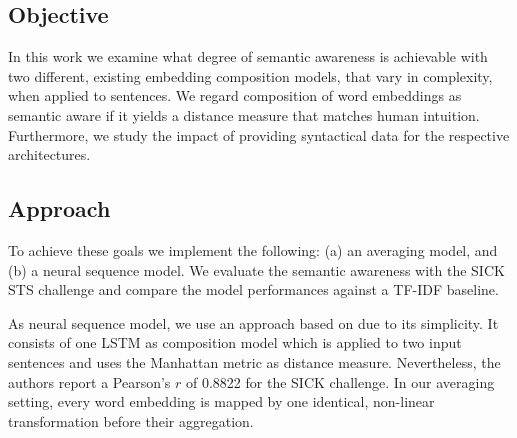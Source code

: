 
\subsection{Objective}
In this work we examine what degree of semantic awareness is achievable with two different, existing embedding composition models, that vary in complexity, when applied to sentences.%
We regard composition of word embeddings as semantic aware if it yields a distance measure that matches human intuition. Furthermore, we study the impact of providing syntactical data for the respective architectures.

\subsection{Approach}
To achieve these goals we implement the following: (a) an averaging model, and (b) a neural sequence model. We evaluate the semantic awareness with the SICK \ac{STS} challenge \autocite{marelli_sick_2014} and compare the model performances against a \acs{TF-IDF} baseline.



As neural sequence model, we use an approach based on \Textcite{mueller_siamese_2016} due to its simplicity. It consists of one LSTM as composition model which is applied to two input sentences and uses the Manhattan metric as distance measure. Nevertheless, the authors report a Pearson's $r$ of 0.8822 for the SICK challenge. In our averaging setting, every word embedding is mapped by one identical, non-linear transformation before their aggregation.

